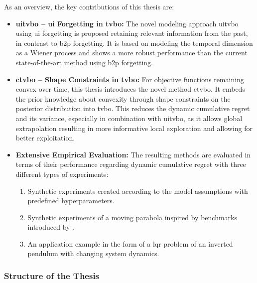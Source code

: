 As an overview, the key contributions of this thesis are:
\begin{itemize}

    \item \textbf{\gls{uitvbo} -- \gls{ui} Forgetting in \gls{tvbo}:} The novel modeling approach \gls{uitvbo} using \gls{ui} forgetting is proposed retaining relevant information from the past, in contrast to \gls{b2p} forgetting. It is based on modeling the temporal dimension as a Wiener process and shows a more robust performance than the current state-of-the-art method using \gls{b2p} forgetting.
    
  
    \item \textbf{\gls{ctvbo} -- Shape Constraints in \gls{tvbo}:} For objective functions remaining convex over time, this thesis introduces the novel method \gls{ctvbo}. It embeds the prior knowledge about convexity through shape constraints on the posterior distribution into \gls{tvbo}. This reduces the dynamic cumulative regret and its variance, especially in combination with \gls{uitvbo}, as it allows global extrapolation resulting in more informative local exploration and allowing for better exploitation.
    
    \item \textbf{Extensive Empirical Evaluation:} The resulting methods are evaluated in terms of their performance regarding dynamic cumulative regret with three different types of experiments:
    \begin{enumerate}
        \item Synthetic experiments created according to the model assumptions with predefined hyperparameters.
        \item Synthetic experiments of a moving parabola inspired by benchmarks introduced by \textcite{Renganathan_2020}.
        \item An application example in the form of a \gls{lqr} problem of an inverted pendulum with changing system dynamics.
    \end{enumerate}
\end{itemize}


\subsubsection{Structure of the Thesis}

